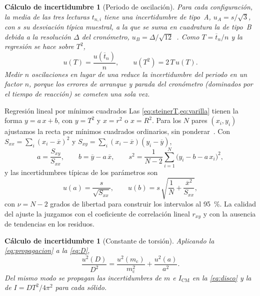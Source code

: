\documentclass[a4paper,11pt]{amsart}
\numberwithin{equation}{section}
\newcommand{\Icm}{I_{\mathrm{CM}}}            %
\newcommand{\mc}{m_{\mathrm{c}}}
\newcommand{\mean}[1]{\overline{#1}}
\theoremstyle{cienplano}
\theoremstyle{ciendef}
\newtheorem{calculo}[proposicion]{Cálculo de incertidumbre}
\theoremstyle{cienobs}
\newcounter{metodo}
\newenvironment{metodo}[1][]
  {\par\stepcounter{proposicion}\refstepcounter{metodo}\begin{metodobox}{#1}}
  {\end{metodobox}}
\begin{document}
\begin{calculo}[Periodo de oscilación]\label{calc:T}
Para cada configuración, la media de las tres lecturas $t_{n,i}$ tiene una
incertidumbre de tipo~A, $u_A=s/\sqrt{3}$, con $s$ su desviación típica
muestral, a la que se suma en cuadratura la de tipo~B debida a la resolución
$\Delta$ del cronómetro, $u_B=\Delta/\sqrt{12}$~\cite{NUM-ARG,ERR-MP}.
Como $T=\mean{t}_{n}/n$ y la regresión se hace sobre $T^{2}$,
\begin{equation}\label{eq:uT}
  u(T)=\frac{u(\mean{t}_{n})}{n},
  \qquad
  u(T^{2})=2\,T\,u(T).
\end{equation}
Medir $n$ oscilaciones en lugar de una reduce la incertidumbre del periodo
en un factor $n$, porque los errores de arranque y parada del cronómetro
(dominados por el tiempo de reacción) se cometen una sola vez.
\end{calculo}

\begin{metodo}[Regresión lineal por mínimos cuadrados]\label{met:regresion}
Las \cref{eq:steinerT,eq:varilla} tienen la forma $y=a\,x+b$, con $y=T^{2}$
y $x=r^{2}$ o $x=R^{2}$. Para los $N$ pares $(x_i,y_i)$ ajustamos la recta
por mínimos cuadrados ordinarios, sin ponderar~\cite{NUM-ARG,HUGHES}. Con
$S_{xx}=\sum_i(x_i-\mean{x})^{2}$ y $S_{xy}=\sum_i(x_i-\mean{x})(y_i-\mean{y})$,
\begin{equation}\label{eq:regresion}
  a=\frac{S_{xy}}{S_{xx}},
  \qquad
  b=\mean{y}-a\,\mean{x},
  \qquad
  s^{2}=\frac{1}{N-2}\sum_{i=1}^{N}\bigl(y_i-b-a\,x_i\bigr)^{2},
\end{equation}
y las incertidumbres típicas de los parámetros son
\begin{equation}\label{eq:uregresion}
  u(a)=\frac{s}{\sqrt{S_{xx}}},
  \qquad
  u(b)=s\,\sqrt{\frac{1}{N}+\frac{\mean{x}^{2}}{S_{xx}}},
\end{equation}
con $\nu=N-2$ grados de libertad para construir los intervalos al
\SI{95}{\percent}. La calidad del ajuste la juzgamos con el coeficiente de
correlación lineal $r_{xy}$ y con la ausencia de tendencias en los
residuos.
\end{metodo}

\begin{calculo}[Constante de torsión]\label{calc:D}
Aplicando la \cref{eq:propagacion} a la \cref{eq:D},
\begin{equation}\label{eq:uD}
  \frac{u^{2}(D)}{D^{2}}=\frac{u^{2}(\mc)}{\mc^{2}}+\frac{u^{2}(a)}{a^{2}}.
\end{equation}
Del mismo modo se propagan las incertidumbres de $m$ e $\Icm$ en la
\cref{eq:disco} y la de $I=DT^{2}/4\pi^{2}$ para cada sólido.
\end{calculo}
\end{document}
